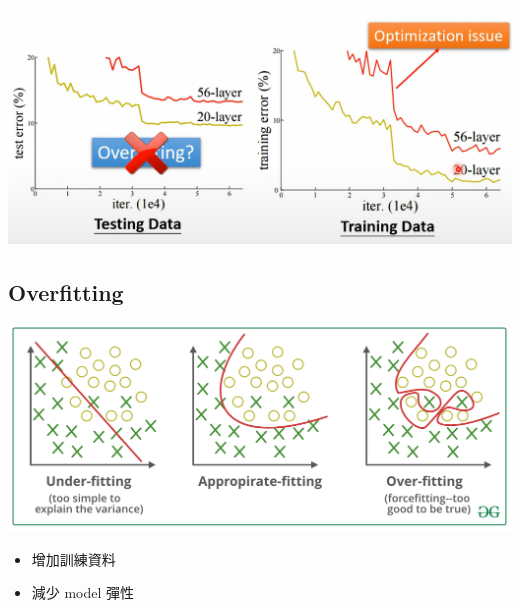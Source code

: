 \includegraphics[width=1\textwidth]{paste_src/2025-03-20-04-48-18.png}



\subsection*{Overfitting}

\includegraphics[width=1\textwidth]{paste_src/2025-03-20-04-57-13.png}

\begin{itemize}
  \item 增加訓練資料
  \item 減少 model 彈性 
\end{itemize}
